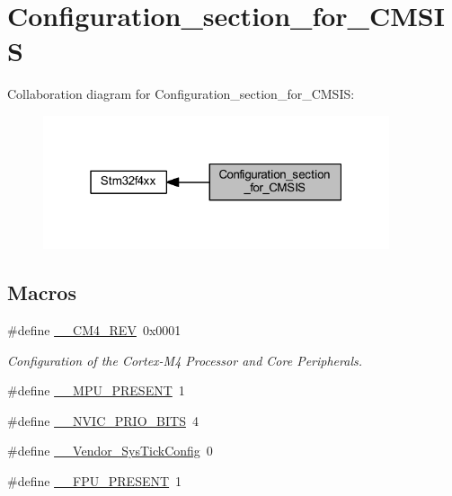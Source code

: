 \hypertarget{group___configuration__section__for___c_m_s_i_s}{}\section{Configuration\+\_\+section\+\_\+for\+\_\+\+C\+M\+S\+IS}
\label{group___configuration__section__for___c_m_s_i_s}
Collaboration diagram for Configuration\+\_\+section\+\_\+for\+\_\+\+C\+M\+S\+IS\+:\nopagebreak
\begin{figure}[H]
\begin{center}
\leavevmode
\includegraphics[width=289pt]{group___configuration__section__for___c_m_s_i_s}
\end{center}
\end{figure}
\subsection*{Macros}
\begin{DoxyCompactItemize}
\item 
\#define \hyperlink{group___configuration__section__for___c_m_s_i_s_ga45a97e4bb8b6ce7c334acc5f45ace3ba}{\+\_\+\+\_\+\+C\+M4\+\_\+\+R\+EV}~0x0001
\begin{DoxyCompactList}\small\item\em Configuration of the Cortex-\/\+M4 Processor and Core Peripherals. \end{DoxyCompactList}\item 
\#define \hyperlink{group___configuration__section__for___c_m_s_i_s_ga4127d1b31aaf336fab3d7329d117f448}{\+\_\+\+\_\+\+M\+P\+U\+\_\+\+P\+R\+E\+S\+E\+NT}~1
\item 
\#define \hyperlink{group___configuration__section__for___c_m_s_i_s_gae3fe3587d5100c787e02102ce3944460}{\+\_\+\+\_\+\+N\+V\+I\+C\+\_\+\+P\+R\+I\+O\+\_\+\+B\+I\+TS}~4
\item 
\#define \hyperlink{group___configuration__section__for___c_m_s_i_s_gab58771b4ec03f9bdddc84770f7c95c68}{\+\_\+\+\_\+\+Vendor\+\_\+\+Sys\+Tick\+Config}~0
\item 
\#define \hyperlink{group___configuration__section__for___c_m_s_i_s_gac1ba8a48ca926bddc88be9bfd7d42641}{\+\_\+\+\_\+\+F\+P\+U\+\_\+\+P\+R\+E\+S\+E\+NT}~1
\end{DoxyCompactItemize}
